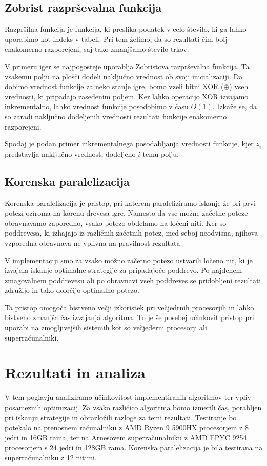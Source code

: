 \documentclass[12pt]{report}
\begin{document}
\section{Zobrist razprševalna funkcija}
Razpršilna funkcija je funkcija, ki preslika podatek v celo število, ki ga lahko uporabimo kot indeks v tabeli. Pri tem želimo, da so rezultati čim bolj enakomerno razporejeni, saj tako zmanjšamo število trkov.

V primeru iger se najpogosteje uporablja Zobristova razprševalna funkcija. Ta vsakemu polju na plošči dodeli naključno vrednost ob svoji inicializaciji. Da dobimo vrednost funkcije za neko stanje igre, bomo vzeli bitni XOR ($\oplus$) vseh vrednosti, ki pripadajo zasedenim poljem. Ker lahko operacijo XOR izvajamo inkrementalno, lahko vrednost funkcije posodobimo v času $O(1)$. Izkaže se, da so zaradi naključno dodeljenih vrednosti rezultati funkcije enakomerno razporejeni. 

Spodaj je podan primer inkrementalnega posodabljanja vrednosti funkcije, kjer $z_i$ predstavlja naključno vrednost, dodeljeno $i$-temu polju.



\section{Korenska paralelizacija}
Korenska paralelizacija je pristop, pri katerem paraleliziramo iskanje že pri prvi potezi oziroma na korenu drevesa igre. Namesto da vse možne začetne poteze obravnavamo zaporedno, vsako potezo obdelamo na ločeni niti. Ker so poddrevesa, ki izhajajo iz različnih začetnih potez, med seboj neodvisna, njihova vzporedna obravnava ne vplivna na pravilnost rezultata.

V implementaciji smo za vsako možno začetno potezo ustvarili ločeno nit, ki je izvajala iskanje optimalne strategije za pripadajoče poddrevo. Po najdenem zmagovalnem poddrevesu ali po obravnavi vseh poddreves se pridobljeni rezultati združijo in tako določijo optimalno potezo.

Ta pristop omogoča bistveno večji izkoristek pri večjedrnih procesorjih in lahko bistveno zmanjša čas izvajanja algoritma. To je še posebej učinkovit pristop pri uporabi na zmogljivejših sistemih kot so večjederni procesorji ali superračunalniki.

\chapter{Rezultati in analiza}
V tem poglavju analiziramo učinkovitost implementiranih algoritmov ter vpliv posameznih optimizacij. Za vsako različico algoritma bomo izmerili čas, porabljen pri iskanju strategije in obrazložili razloge za temi rezultati. Testiranje bo potekalo na prenosnem računalniku z AMD Ryzen 9 5900HX procesorjem z 8 jedri in 16GB rama, ter na Arnesovem superračunalniku z AMD EPYC 9254 procesorjem s 24 jedri in 128GB rama. Korenska paralelizacija je bila testirana na superračunalniku z 12 nitimi.
\end{document}
